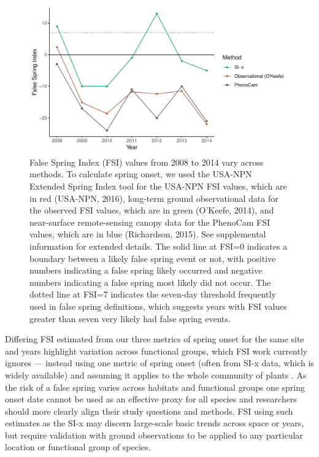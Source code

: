 \documentclass{article}\usepackage[]{graphicx}\usepackage[]{color}
\makeatletter
\def\maxwidth{ %
  \ifdim\Gin@nat@width>\linewidth
    \linewidth
  \else
    \Gin@nat@width
  \fi
}
\makeatother
\begin{document}
\begin{figure}[H]

{\centering \includegraphics[width=\maxwidth]{figure/fsifig-1} 

}

\caption[False Spring Index (FSI) values from 2008 to 2014 vary across methods]{False Spring Index (FSI) values from 2008 to 2014 vary across methods. To calculate spring onset, we used the USA-NPN Extended Spring Index tool for the USA-NPN FSI values, which are in red (USA-NPN, 2016), long-term ground observational data for the observed FSI values, which are in green (O'Keefe, 2014), and near-surface remote-sensing canopy data for the PhenoCam FSI values, which are in blue (Richardson, 2015). See supplemental information for extended details. The solid line at FSI=0 indicates a boundary between a likely false spring event or not, with positive numbers indicating a false spring likely occurred and negative numbers indicating a false spring most likely did not occur. The dotted line at FSI=7 indicates the seven-day threshold frequently used in false spring definitions, which suggests years with FSI values greater than seven very likely had false spring events.}\label{fig:fsifig}
\end{figure}



Differing FSI estimated from our three metrics of spring onset for the same site and years highlight variation across functional groups, which FSI work currently ignores --- instead using one metric of spring onset (often from SI-x data, which is widely available) and assuming it applies to the whole community of plants \citep{Allstadt2015, Marino2011, Mehdipoor2017, Peterson2014}. As the risk of a false spring varies across habitats and functional groups \citep{Martin2010} one spring onset date cannot be used as an effective proxy for all species and researchers should more clearly align their study questions and methods. FSI using such estimates as the SI-x may discern large-scale basic trends across space or years, but require validation with ground observations to be applied to any particular location or functional group of species. 
\end{document}
